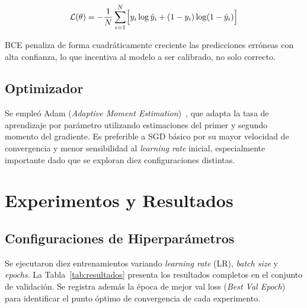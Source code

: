 \documentclass[conference]{IEEEtran}
\begin{document}
\begin{equation}
  \mathcal{L}(\theta)
  = -\frac{1}{N}\sum_{i=1}^{N}
    \Bigl[y_i \log\hat{y}_i + (1-y_i)\log(1-\hat{y}_i)\Bigr]
\end{equation}

BCE penaliza de forma cuadr\'{a}ticamente creciente las predicciones err\'{o}neas con alta confianza, lo que incentiva al modelo a ser calibrado, no solo correcto.

\subsection{Optimizador}

Se emple\'{o} Adam (\textit{Adaptive Moment Estimation})~\cite{kingma2014}, que adapta la tasa de aprendizaje por par\'{a}metro utilizando estimaciones del primer y segundo momento del gradiente. Es preferible a SGD b\'{a}sico por su mayor velocidad de convergencia y menor sensibilidad al \textit{learning rate} inicial, especialmente importante dado que se exploran diez configuraciones distintas.

\section{Experimentos y Resultados}

\subsection{Configuraciones de Hiperpar\'{a}metros}

Se ejecutaron diez entrenamientos variando \textit{learning rate} (LR), \textit{batch size} y \textit{epochs}. La Tabla~\ref{tab:resultados} presenta los resultados completos en el conjunto de validaci\'{o}n. Se registra adem\'{a}s la \'{e}poca de mejor val loss (\textit{Best Val Epoch}) para identificar el punto \'{o}ptimo de convergencia de cada experimento.
\end{document}
